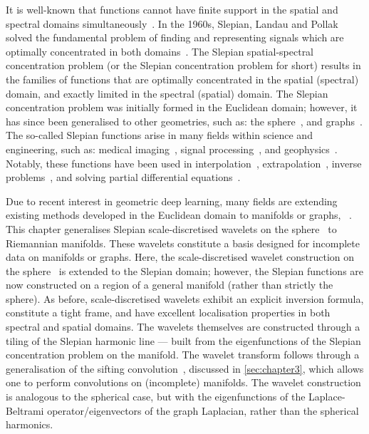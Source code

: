 It is well-known that functions cannot have finite support in the spatial and spectral domains simultaneously~\cite{Slepian1961,Slepian1983}.
In the 1960s, Slepian, Landau and Pollak solved the fundamental problem of finding and representing signals which are optimally concentrated in both domains~\cite{Slepian1961,Landau1961,Landau1962}.
The Slepian spatial-spectral concentration problem (or the Slepian concentration problem for short) results in the families of functions that are optimally concentrated in the spatial (spectral) domain, and exactly limited in the spectral (spatial) domain.
The Slepian concentration problem was initially formed in the Euclidean domain; however, it has since been generalised to other geometries, such as: the sphere~\cite{Simons2006,Wieczorek2005,Albertella1999,Cohen1989,Meaney1984,Daubechies1988}, and graphs~\cite{VanDeVille2017,VanDeVille2017a,Bolton2018}.
The so-called Slepian functions arise in many fields within science and engineering, such as: medical imaging~\cite{Jackson1991}, signal processing~\cite{Mathews1985,Thomson1982}, and geophysics~\cite{Thomson1976,Simons2006a,Simons2011}.
Notably, these functions have been used in interpolation~\cite{Moore2004,Shkolnisky2006}, extrapolation~\cite{Xu1983}, inverse problems~\cite{Villiers2001,Abdelmoula2015}, and solving partial differential equations~\cite{Boyd2003,Chen2005}.

Due to recent interest in geometric deep learning, many fields are extending existing methods developed in the Euclidean domain to manifolds or graphs, \ie{}~\cite{Perlmutter2020}.
This chapter generalises Slepian scale-discretised wavelets on the sphere~\cite{Roddy2022} to Riemannian manifolds.
These wavelets constitute a basis designed for incomplete data on manifolds or graphs.
Here, the scale-discretised wavelet construction on the sphere~\cite{Wiaux2008,McEwen2018,Leistedt2013,McEwen2013,McEwen2015} is extended to the Slepian domain; however, the Slepian functions are now constructed on a region of a general manifold (rather than strictly the sphere).
As before, scale-discretised wavelets exhibit an explicit inversion formula, constitute a tight frame, and have excellent localisation properties in both spectral and spatial domains.
The wavelets themselves are constructed through a tiling of the Slepian harmonic line --- built from the eigenfunctions of the Slepian concentration problem on the manifold.
The wavelet transform follows through a generalisation of the sifting convolution~\cite{Roddy2021}, discussed in \cref{sec:chapter3}, which allows one to perform convolutions on (incomplete) manifolds.
The wavelet construction is analogous to the spherical case, but with the eigenfunctions of the Laplace-Beltrami operator/eigenvectors of the graph Laplacian, rather than the spherical harmonics.

